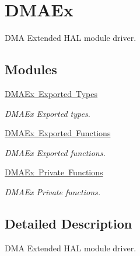 \hypertarget{group___d_m_a_ex}{}\section{D\+M\+A\+Ex}
\label{group___d_m_a_ex}


D\+MA Extended H\+AL module driver.  


\subsection*{Modules}
\begin{DoxyCompactItemize}
\item 
\mbox{\hyperlink{group___d_m_a_ex___exported___types}{D\+M\+A\+Ex Exported Types}}
\begin{DoxyCompactList}\small\item\em D\+M\+A\+Ex Exported types. \end{DoxyCompactList}\item 
\mbox{\hyperlink{group___d_m_a_ex___exported___functions}{D\+M\+A\+Ex Exported Functions}}
\begin{DoxyCompactList}\small\item\em D\+M\+A\+Ex Exported functions. \end{DoxyCompactList}\item 
\mbox{\hyperlink{group___d_m_a_ex___private___functions}{D\+M\+A\+Ex Private Functions}}
\begin{DoxyCompactList}\small\item\em D\+M\+A\+Ex Private functions. \end{DoxyCompactList}\end{DoxyCompactItemize}


\subsection{Detailed Description}
D\+MA Extended H\+AL module driver. 


